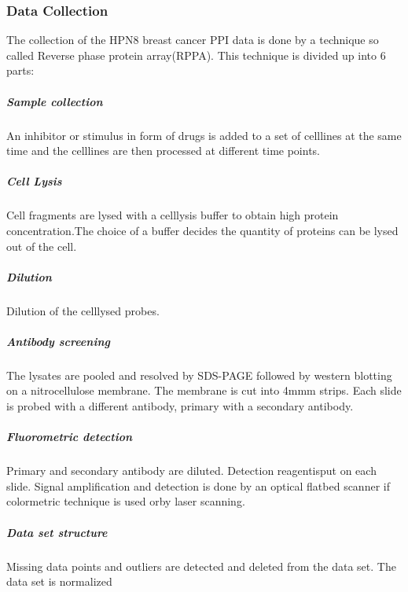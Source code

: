 \subsubsection*{Data Collection}
The collection of the HPN8 breast cancer PPI data is done by a technique so called Reverse phase protein array(RPPA). This technique is divided up into 6 parts:
\subparagraph*{Sample collection}
An inhibitor or stimulus in form of drugs is added to a set of celllines at the same time and the celllines are then processed at different time points.
\subparagraph*{Cell Lysis}
Cell fragments are lysed with a celllysis buffer to obtain high protein concentration.The choice of a buffer decides the quantity of proteins can be lysed out of the cell.
\subparagraph*{Dilution}
Dilution of the celllysed probes.
\subparagraph*{Antibody screening}
The lysates are pooled and resolved by SDS-PAGE followed by western blotting on a nitrocellulose membrane. The membrane is cut into 4mmm strips. Each slide is probed with a  different antibody, primary with a secondary antibody.
\subparagraph*{Fluorometric detection}
Primary and secondary antibody are diluted.%
Detection reagentisput on each slide. Signal amplification and detection is done by an optical flatbed scanner if colormetric technique is used orby laser scanning. %
\subparagraph*{Data set structure}
Missing data points and outliers are detected and deleted from the data set. The data set is normalized %



